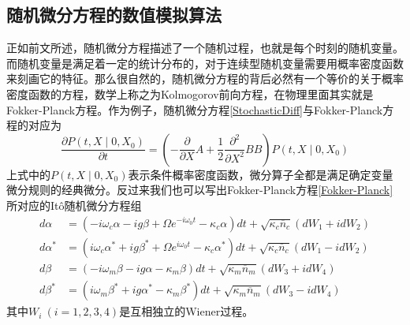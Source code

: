 \subsection{随机微分方程的数值模拟算法}
正如前文所述，随机微分方程描述了一个随机过程，也就是每个时刻的随机变量。而随机变量是满足着一定的统计分布的，对于连续型随机变量需要用概率密度函数来刻画它的特征。那么很自然的，随机微分方程的背后必然有一个等价的关于概率密度函数的方程，数学上称之为Kolmogorov前向方程，在物理里面其实就是Fokker-Planck方程。作为例子，随机微分方程\eqref{StochasticDiff}与Fokker-Planck方程的对应为
\begin{equation}
\frac{\partial P\left(t,X \mid 0,X_{0}\right)}{\partial t} = \left(-\frac{\partial}{\partial X} A+\frac{1}{2} \frac{\partial^{2}}{\partial X^2} BB\right) P\left(t,X \mid 0,X_{0}\right)
\end{equation}
上式中的$P\left(t,X \mid 0,X_{0}\right)$表示条件概率密度函数，微分算子全都是满足确定变量微分规则的经典微分。反过来我们也可以写出Fokker-Planck方程\eqref{Fokker-Planck}所对应的It\^o随机微分方程组
\begin{align}
d{{\alpha}}&=(-i\omega_{c}{\alpha}-ig{\beta}+\Omega e^{-i\omega_{0}t}-\kappa_{c}{\alpha})dt+\sqrt{\kappa_c\overline{n}_{c}}(dW_1+idW_2) \label{sdes1} \\
d{{\alpha^{*}}}&=(i\omega_{c}{\alpha^{*}}+ig{\beta^{*}}+\Omega e^{i\omega_{0}t}-\kappa_{c}{\alpha^{*}})dt+\sqrt{\kappa_c\overline{n}_{c}}(dW_1-idW_2) \\
d{{\beta}}&=(-i\omega_{m}{\beta}-ig{\alpha}-\kappa_{m}{\beta})dt+\sqrt{\kappa_m\overline{n}_{m}}(dW_3+idW_4) \\
d{{\beta^{*}}}&=(i\omega_{m}{\beta^{*}}+ig{\alpha^{*}}-\kappa_{m}{\beta^{*}})dt+\sqrt{\kappa_m\overline{n}_{m}}(dW_3-idW_4) \label{sdes4}
\end{align}
其中$W_i~(i=1,2,3,4)$是互相独立的Wiener过程。

